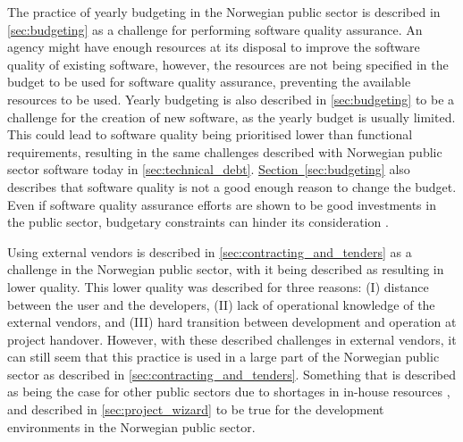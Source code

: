 The practice of yearly budgeting in the Norwegian public sector is described in \autoref{sec:budgeting} as a challenge for performing software quality assurance. An agency might have enough resources at its disposal to improve the software quality of existing software, however, the resources are not being specified in the budget to be used for software quality assurance, preventing the available resources to be used. Yearly budgeting is also described in \autoref{sec:budgeting} to be a challenge for the creation of new software, as the yearly budget is usually limited. This could lead to software quality being prioritised lower than functional requirements, resulting in the same challenges described with Norwegian public sector software today in \autoref{sec:technical_debt}. \hyperref[sec:budgeting]{Section~\ref*{sec:budgeting}} also describes that software quality is not a good enough reason to change the budget. Even if software quality assurance efforts are shown to be good investments in the public sector, budgetary constraints can hinder its consideration \cite{jc_2010}.  


Using external vendors is described in \autoref{sec:contracting_and_tenders} as a challenge in the Norwegian public sector, with it being described as resulting in lower quality. This lower quality was described for three reasons: (I) distance between the user and the developers, (II) lack of operational knowledge of the external vendors, and (III) hard transition between development and operation at project handover. However, with these described challenges in external vendors, it can still seem that this practice is used in a large part of the Norwegian public sector as described in \autoref{sec:contracting_and_tenders}. Something that is described as being the case for other public sectors due to shortages in in-house resources \cite{jc_2010}, and described in \autoref{sec:project_wizard} to be true for the development environments in the Norwegian public sector.


